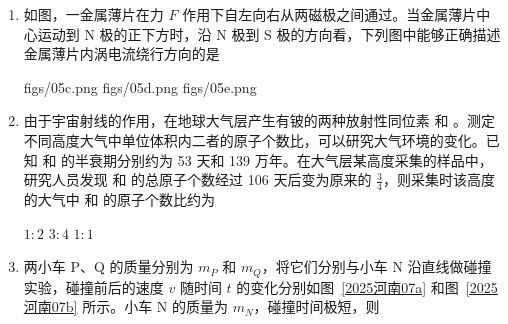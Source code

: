 \documentclass[\gkver]{gaokaozhenti}
\begin{document}
\begin{enumerate}
{

故选 C。
}

\item
如图，一金属薄片在力 $F$ 作用下自左向右从两磁极之间通过。当金属薄片中心运动到 N 极的正下方时，沿 N 极到 S 极的方向看，下列图中能够正确描述金属薄片内涡电流绕行方向的是


{figs/05c.png}
{figs/05d.png}
{figs/05e.png}


\item
由于宇宙射线的作用，在地球大气层产生有铍的两种放射性同位素  和 。测定不同高度大气中单位体积内二者的原子个数比，可以研究大气环境的变化。已知  和  的半衰期分别约为 53 天和 139 万年。在大气层某高度采集的样品中，研究人员发现  和  的总原子个数经过 106 天后变为原来的 $\frac{3}{4}$，则采集时该高度的大气中  和  的原子个数比约为

{$1:2$}
{$3:4$}
{$1:1$}


\item
两小车 P、Q 的质量分别为 $m_{P}$ 和 $m_{Q}$，将它们分别与小车 N 沿直线做碰撞实验，碰撞前后的速度 $v$ 随时间 $t$ 的变化分别如图~\ref{2025河南07a} 和图~\ref{2025河南07b} 所示。小车 N 的质量为 $m_{N}$，碰撞时间极短，则


\end{enumerate}
\end{document}

